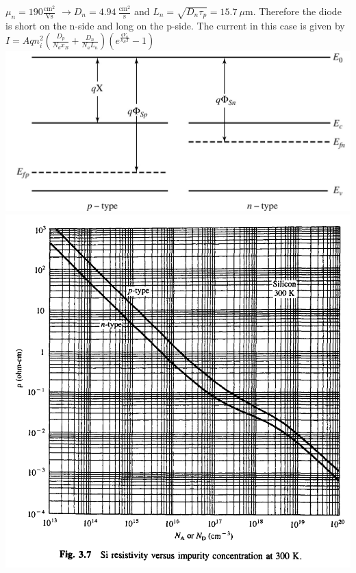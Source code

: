 \begin{multicols}{3}
        $\mu_n=190 \frac{\text{cm}^2}{\text{Vs}} $ 
        $\rightarrow D_n=4.94 \ \frac{\text{cm}^2}{\text{s}}$
        and $L_n=\sqrt{D_n \tau_p}=15.7 \ \mu$m. Therefore the diode is short on the n-side and long on the p-side. The current in this case is given by
        $I=Aqn_i^2 \left(\frac{D_p}{N_dx_B}+\frac{D_n}{N_a L_n}\right)(e^{\frac{qV_a}{k_BT}}-1)$
        \medbreak\noindent\minipage{\columnwidth}
            \includegraphics[width=\columnwidth]{LectureNotesIIJunc.png}
        \endminipage\medbreak   
          \medbreak\noindent\minipage{\columnwidth}
            \includegraphics[width=\columnwidth]{VIFigure3-7.png}
        \endminipage\medbreak 
        

\end{multicols}
